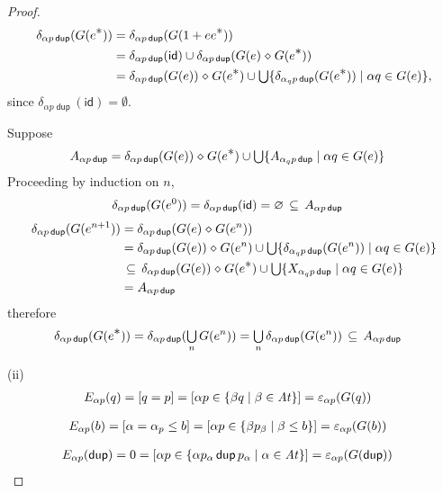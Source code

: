 \documentclass{article}
\newcommand\At{\ensuremath{\mathit{At}}}
\renewcommand\smash{\mathrel{\diamond}}
\newcommand\pdup{\mathop{\mathsf{dup}}}
\newcommand\bval[1]{[#1]}
\renewcommand\star{^{\textstyle *}}
\newcommand\id{\mathsf{id}}
\newcommand\sbigcup{\mathop{\textstyle\bigcup}}
\begin{document}
\begin{proof}
\begin{align*}
\delta_{\alpha p\pdup}(G(e\star))
&= \delta_{\alpha p\pdup}(G(1+ee\star))\\
&= \delta_{\alpha p\pdup}(\id) \cup \delta_{\alpha p\pdup}(G(e)\smash G(e\star))\\
&= \delta_{\alpha p\pdup}(G(e))\smash G(e\star) \cup \sbigcup \set{\delta_{\alpha_q p\pdup}(G(e\star))}{\alpha q\in G(e)},
\end{align*}
since $\delta_{\alpha p\pdup}(\id) = \emptyset$.

Suppose
\begin{align*}
A_{\alpha p\pdup}
&= \delta_{\alpha p\pdup}(G(e))\smash G(e\star) \cup \sbigcup \set{A_{\alpha_q p\pdup}}{\alpha q\in G(e)}
\end{align*}
Proceeding by induction on $n$,
\begin{align*}
\delta_{\alpha p\pdup}(G(e^0))
&= \delta_{\alpha p\pdup}(\id)
= \emptyset
\subs A_{\alpha p\pdup}
\end{align*}
\begin{align*}
\delta_{\alpha p\pdup}(G(e^{n+1}))
&= \delta_{\alpha p\pdup}(G(e)\smash G(e^n))\\
&= \delta_{\alpha p\pdup}(G(e))\smash G(e^n) \cup \sbigcup \set{\delta_{\alpha_q p\pdup}(G(e^n))}{\alpha q\in G(e)}\\
&\subs \delta_{\alpha p\pdup}(G(e))\smash G(e\star) \cup \sbigcup \set{X_{\alpha_q p\pdup}}{\alpha q\in G(e)}\\
&= A_{\alpha p\pdup}
\end{align*}
therefore
\begin{align*}
\delta_{\alpha p\pdup}(G(e\star))
&= \delta_{\alpha p\pdup}(\sbigcup_n G(e^n))
= \sbigcup_n\delta_{\alpha p\pdup}(G(e^n))
\subs A_{\alpha p\pdup}
\end{align*}

(ii)
\begin{align*}
E_{\alpha p}(q)
&= \bval{q = p}
= \bval{\alpha p\in\set{\beta q}{\beta\in\At}}
= \eps_{\alpha p}(G(q))
\end{align*}

\begin{align*}
E_{\alpha p}(b)
&= \bval{\alpha=\alpha_p\leq b}
= \bval{\alpha p\in\set{\beta p_\beta}{\beta\leq b}}
= \eps_{\alpha p}(G(b))
\end{align*}

\begin{align*}
E_{\alpha p}(\pdup)
&= 0
= \bval{\alpha p\in\set{\alpha p_\alpha\pdup p_\alpha}{\alpha\in\At}}
= \eps_{\alpha p}(G(\pdup))
\end{align*}


\end{proof}
\end{document}
